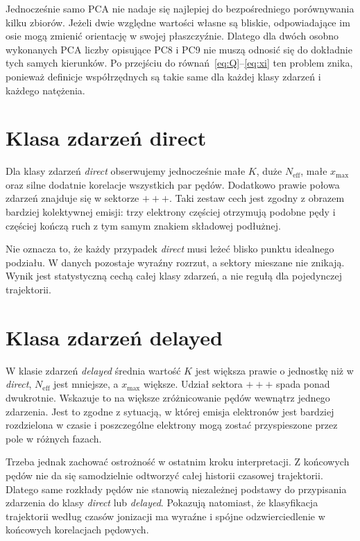\documentclass[12pt,letterpaper,oneside]{report}
\numberwithin{equation}{chapter}
\numberwithin{figure}{chapter}
\numberwithin{table}{chapter}
\newcommand{\direct}{\textit{direct}}
\newcommand{\delayed}{\textit{delayed}}
\begin{document}
Jednocześnie samo PCA nie nadaje się najlepiej do bezpośredniego porównywania kilku zbiorów. Jeżeli dwie względne wartości własne są bliskie, odpowiadające im osie mogą zmienić orientację w swojej płaszczyźnie. Dlatego dla dwóch osobno wykonanych PCA liczby opisujące PC8 i PC9 nie muszą odnosić się do dokładnie tych samych kierunków. Po przejściu do równań~\eqref{eq:Q}--\eqref{eq:xi} ten problem znika, ponieważ definicje współrzędnych są takie same dla każdej klasy zdarzeń i każdego natężenia.

\section{Klasa zdarzeń direct}

Dla klasy zdarzeń \direct{} obserwujemy jednocześnie małe $K$, duże $N_{\mathrm{eff}}$, małe $x_{\max}$ oraz silne dodatnie korelacje wszystkich par pędów. Dodatkowo prawie połowa zdarzeń znajduje się w sektorze $+++$. Taki zestaw cech jest zgodny z obrazem bardziej kolektywnej emisji: trzy elektrony częściej otrzymują podobne pędy i częściej kończą ruch z tym samym znakiem składowej podłużnej.

Nie oznacza to, że każdy przypadek \direct{} musi leżeć blisko punktu idealnego podziału. W danych pozostaje wyraźny rozrzut, a sektory mieszane nie znikają. Wynik jest statystyczną cechą całej klasy zdarzeń, a nie regułą dla pojedynczej trajektorii.

\section{Klasa zdarzeń delayed}

W klasie zdarzeń \delayed{} średnia wartość $K$ jest większa prawie o jednostkę niż w \direct{}, $N_{\mathrm{eff}}$ jest mniejsze, a $x_{\max}$ większe. Udział sektora $+++$ spada ponad dwukrotnie. Wskazuje to na większe zróżnicowanie pędów wewnątrz jednego zdarzenia. Jest to zgodne z sytuacją, w której emisja elektronów jest bardziej rozdzielona w czasie i poszczególne elektrony mogą zostać przyspieszone przez pole w różnych fazach.

Trzeba jednak zachować ostrożność w ostatnim kroku interpretacji. Z końcowych pędów nie da się samodzielnie odtworzyć całej historii czasowej trajektorii. Dlatego same rozkłady pędów nie stanowią niezależnej podstawy do przypisania zdarzenia do klasy \direct{} lub \delayed{}. Pokazują natomiast, że klasyfikacja trajektorii według czasów jonizacji ma wyraźne i spójne odzwierciedlenie w końcowych korelacjach pędowych.
\end{document}
